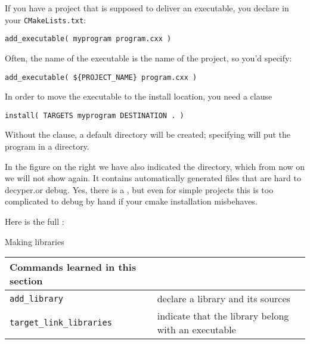 \begin{floatingfigure}[r]{2.5in}
  \begin{minipage}{2.5in}
  \end{minipage}
\end{floatingfigure}
%
If you have a project that is supposed to deliver an executable,
you declare in your \texttt{CMakeLists.txt}:
\begin{lstlisting}
add_executable( myprogram program.cxx )
\end{lstlisting}
Often, the name of the executable is the name of the project,
so you'd specify:
\begin{lstlisting}
add_executable( ${PROJECT_NAME} program.cxx )
\end{lstlisting}
%
In order to move the executable to the install location,
you need a clause
\begin{lstlisting}
install( TARGETS myprogram DESTINATION . )
\end{lstlisting}
Without the  clause, a default  directory
will be created; specifying  will put the
program in a  directory.

\begin{floatingfigure}[r]{2.5in}\vskip3in\end{floatingfigure}
%
In the figure on the right we have also indicated the  directory,
which from now on we will not show again.
It contains automatically generated files that are hard to
decyper.or debug. Yes, there is a , but even for simple
projects this is too complicated to debug by hand if your cmake
installation misbehaves.

Here is the full :
%


\newpage
{} {Making libraries}

\begin{tabular}{lp{3in}}
  \toprule
  Commands learned in this section\\
  \midrule
  \lstinline+add_library+&declare a library and its sources\\
  \lstinline+target_link_libraries+&indicate that the library belong with an executable\\
  \bottomrule
\end{tabular}

